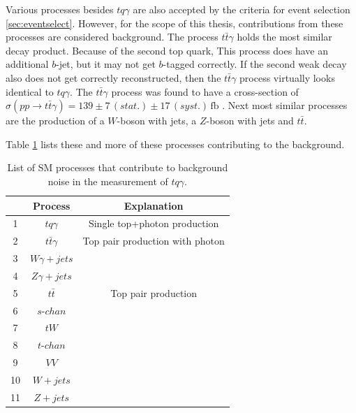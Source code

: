 Various processes besides $tq\gamma$ are also accepted by the criteria for event selection \ref{sec:eventselect}. However, for the scope of this thesis, contributions from these processes are considered background.  
The process $t\bar{t}\gamma$ holds the most similar decay product. Because of the second top quark, This process does have an additional $b$-jet, but it may not get $b$-tagged correctly. If the second weak decay also does not get correctly reconstructed, then the $t\bar{t}\gamma$ process virtually looks identical to $tq\gamma$. 
The $t\bar{t}\gamma$ process was found to have a cross-section of $\sigma(pp \rightarrow t\bar{t}\gamma) = 139 \pm 7 \,(stat.) \pm 17 \,(syst.) \,\si{\femto\barn}$ \cite{ttgamma}. 
Next most similar processes are the production of a $W$-boson with jets, a $Z$-boson with jets and $t\bar{t}$.

Table \ref{tab:background} lists these and more of these processes contributing to the background.
\begin{table}
    \centering
    \begin{tabular}{c c c}
        \toprule
        {} & Process & Explanation\\
        \midrule
        1 & $tq\gamma$&         Single top+photon production\\[.1cm]
        2 & $t\bar{t}\gamma$&   Top pair production with photon\\[.1cm]
        3 & $W\gamma + jets$&   \\[.1cm]
        4 & $Z\gamma + jets$&   \\[.1cm]
        5 & $t\bar{t}$&         Top pair production\\[.1cm]
        6 & $s\text{-}chan$&    \\[.1cm]
        7 & $t W$&              \\[.1cm]
        8 & $t\text{-}chan$&    \\[.1cm]
        9 & $VV$&               \\[.1cm]
        10& $W+jets$&           \\[.1cm]
        11& $Z+jets$&           \\[.1cm]
        \bottomrule
    \end{tabular}
    \caption{List of SM processes that contribute to background noise in the measurement of $tq\gamma$.}
    \label{tab:background}
\end{table}






